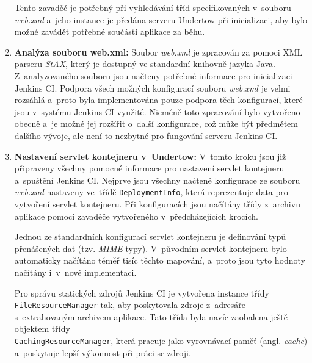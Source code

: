 \begin{enumerate}
                    Tento zavaděč je potřebný
                    při vyhledávání tříd specifikovaných v~souboru \emph{web.xml} a~jeho instance
                    je předána serveru Undertow při inicializaci, aby bylo možné zavádět
                    potřebné součásti aplikace za běhu.

                \item \textbf{Analýza souboru web.xml:} Soubor \emph{web.xml} je 
                    zpracován za pomoci XML parseru \emph{StAX}, který je  dostupný ve standardní knihovně
                    jazyka Java. Z~analyzovaného souboru jsou načteny potřebné informace pro inicializaci
                    Jenkins CI. Podpora všech možných konfigurací souboru \emph{web.xml} je velmi rozsáhlá
                    a~proto byla implementována pouze podpora těch konfigurací, které jsou
                    v~systému Jenkins CI využité. Nicméně toto zpracování bylo vytvořeno obecně 
                    a~je možné jej rozšířit o~další konfigurace, což může být předmětem dalšího vývoje,
                    ale není to nezbytné pro fungování serveru Jenkins CI.
                
                \item \textbf{Nastavení servlet kontejneru v~Undertow:} V~tomto kroku
                    jsou již připraveny všechny pomocné informace pro nastavení servlet kontejneru
                    a~spuštění Jenkins CI. Nejprve jsou všechny načtené konfigurace ze souboru \emph{web.xml}
                    nastaveny ve~třídě \texttt{DeploymentInfo}, která reprezentuje data pro vytvoření servlet
                    kontejneru. Při konfiguracích jsou načítány třídy z~archivu aplikace pomocí zavaděče vytvořeného
                    v~předcházejících krocích.

                    Jednou ze standardních konfigurací servlet kontejneru je definování typů přenášených dat (tzv.
                    \emph{MIME} typy). V~původním servlet kontejneru bylo automaticky načítáno téměř tisíc těchto mapování,
                    a~proto jsou tyto hodnoty načítány i~v~nové implementaci.
                    
                    Pro správu statických zdrojů Jenkins CI je vytvořena instance třídy \\\texttt{FileResourceManager}
                    tak, aby poskytovala zdroje z~adresáře s~extrahovaným archivem aplikace. Tato třída
                    byla navíc zaobalena ještě objektem třídy \\\texttt{CachingResourceManager}, která
                    pracuje jako vyrovnávací paměť (angl. \emph{cache}) a~poskytuje lepší výkonnost
                    při práci se zdroji.



\end{enumerate}
